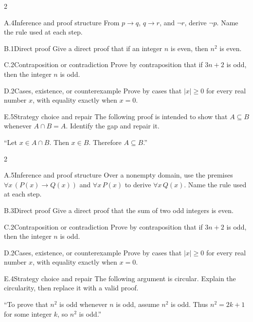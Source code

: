 \documentclass[9pt]{extarticle}
\begin{document}
\begin{multicols}{2}
\begin{CoreProblem}{A.4}{Inference and proof structure}
From $p\to q$, $q\to r$, and $\neg r$, derive $\neg p$. Name the rule used at
each step.
\end{CoreProblem}
\begin{CoreProblem}{B.1}{Direct proof}
Give a direct proof that if an integer $n$ is even, then $n^2$ is even.
\end{CoreProblem}
\begin{CoreProblem}{C.2}{Contraposition or contradiction}
Prove by contraposition that if $3n+2$ is odd, then the integer $n$ is odd.
\end{CoreProblem}
\columnbreak
\begin{CoreProblem}{D.2}{Cases, existence, or counterexample}
Prove by cases that $|x|\ge 0$ for every real number $x$, with equality exactly when $x=0$.
\end{CoreProblem}
\begin{CoreProblem}{E.5}{Strategy choice and repair}
The following proof is intended to show that $A\subseteq B$ whenever
$A\cap B=A$. Identify the gap and repair it.

``Let $x\in A\cap B$. Then $x\in B$. Therefore $A\subseteq B$.''
\end{CoreProblem}
\end{multicols}
\CoreWorkArea
\FormBreak
{}
\begin{multicols}{2}
\begin{CoreProblem}{A.5}{Inference and proof structure}
Over a nonempty domain, use the premises
$\forall x\,(P(x)\to Q(x))$ and $\forall x\,P(x)$ to derive
$\forall x\,Q(x)$. Name the rule used at each step.
\end{CoreProblem}
\begin{CoreProblem}{B.3}{Direct proof}
Give a direct proof that the sum of two odd integers is even.
\end{CoreProblem}
\begin{CoreProblem}{C.2}{Contraposition or contradiction}
Prove by contraposition that if $3n+2$ is odd, then the integer $n$ is odd.
\end{CoreProblem}
\columnbreak
\begin{CoreProblem}{D.2}{Cases, existence, or counterexample}
Prove by cases that $|x|\ge 0$ for every real number $x$, with equality exactly when $x=0$.
\end{CoreProblem}
\begin{CoreProblem}{E.4}{Strategy choice and repair}
The following argument is circular. Explain the circularity, then replace it with a valid proof.

``To prove that $n^2$ is odd whenever $n$ is odd, assume $n^2$ is odd. Thus
$n^2=2k+1$ for some integer $k$, so $n^2$ is odd.''
\end{CoreProblem}
\end{multicols}
\end{document}
